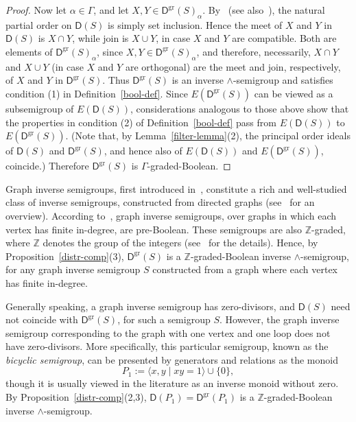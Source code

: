 \documentclass[a4paper,reqno,12pt]{amsart}
\numberwithin{equation}{section}
\theoremstyle{plain}
\theoremstyle{definition}
\newcommand{\gr}{\operatorname{gr}}
\def \Z{\mathbb Z}
\begin{document}
\begin{proof}
Now let $\alpha \in \Gamma$, and let $X, Y \in \mathsf{D}^{\gr}(S)_{\alpha}$. By~\cite[Lemma 2.10]{Lawson3} (see also~\cite[Lemma 2.17]{Lawson3}), the natural partial order on $\mathsf{D}(S)$ is simply set inclusion. Hence the meet of $X$ and $Y$ in $\mathsf{D}(S)$ is $X \cap Y$, while join is $X \cup Y$, in case $X$ and $Y$ are compatible. Both are elements of $\mathsf{D}^{\gr}(S)_{\alpha}$, since $X,Y \in \mathsf{D}^{\gr}(S)_{\alpha}$, and therefore, necessarily, $X \cap Y$ and $X \cup Y$ (in case $X$ and $Y$ are orthogonal) are the meet and join, respectively, of $X$ and $Y$ in $\mathsf{D}^{\gr}(S)$. Thus $\mathsf{D}^{\gr}(S)$ is an inverse $\land$-semigroup and satisfies condition (1) in Definition~\ref{bool-def}. Since $E(\mathsf{D}^{\gr}(S))$ can be viewed as a subsemigroup of $E(\mathsf{D}(S))$, considerations analogous to those above show that the properties in condition (2) of Definition~\ref{bool-def} pass from $E(\mathsf{D}(S))$ to $E(\mathsf{D}^{\gr}(S))$. (Note that, by Lemma~\ref{filter-lemma}(2), the principal order ideals of $\mathsf{D}(S)$ and $\mathsf{D}^{\gr}(S)$, and hence also of $E(\mathsf{D}(S))$ and $E(\mathsf{D}^{\gr}(S))$, coincide.) Therefore $\mathsf{D}^{\gr}(S)$ is $\Gamma$-graded-Boolean.
\end{proof}

Graph inverse semigroups, first introduced in~\cite{AH}, constitute a rich and well-studied class of inverse semigroups, constructed from directed graphs (see~\cite{MM} for an overview). According to~\cite[Theorem 4.10]{Lawson3}, graph inverse semigroups, over graphs in which each vertex has finite in-degree, are pre-Boolean. These semigroups are also $\Z$-graded, where $\Z$ denotes the group of the integers (see~\cite[Section 8.1]{RZ} for the details). Hence, by Proposition~\ref{distr-comp}(3), $\mathsf{D}^{\gr}(S)$ is a $\Z$-graded-Boolean inverse $\land$-semigroup, for any graph inverse semigroup $S$ constructed from a graph where each vertex has finite in-degree.

Generally speaking, a graph inverse semigroup has zero-divisors, and $\mathsf{D}(S)$ need not coincide with $\mathsf{D}^{\gr}(S)$, for such a semigroup $S$. However, the graph inverse semigroup corresponding to the graph with one vertex and one loop does not have zero-divisors. More specifically, this particular semigroup, known as the \emph{bicyclic semigroup}, can be presented by generators and relations as the monoid
\[P_1 := \langle x,y \mid xy = 1\rangle \cup \{0\},\]
though it is usually viewed in the literature as an inverse monoid without zero. By Proposition~\ref{distr-comp}(2,3), $\mathsf{D}(P_1) = \mathsf{D}^{\gr}(P_1)$ is a $\Z$-graded-Boolean inverse $\land$-semigroup.
\end{document}
